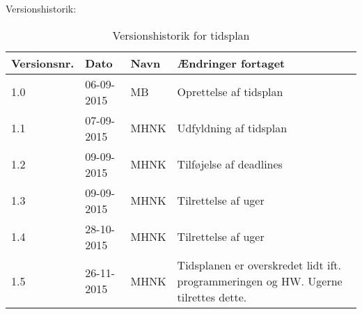 \documentclass[landscape, 12pt, letterpaper]{article}
\begin{document}
\begin{table}[]
Versionshistorik:
\centering
\caption{Versionshistorik for tidsplan}
\label{my-label}
\begin{tabular}{|l|l|l|l|}
\hline
Versionsnr. & Dato       & Navn & Ændringer fortaget     \\ \hline
1.0         & 06-09-2015 & MB   & Oprettelse af tidsplan \\ \hline
1.1         & 07-09-2015 & MHNK & Udfyldning af tidsplan \\ \hline
1.2         & 09-09-2015 & MHNK & Tilføjelse af deadlines\\ \hline
1.3         & 09-09-2015 & MHNK & Tilrettelse af uger    \\ \hline
1.4         & 28-10-2015 & MHNK & Tilrettelse af uger    \\ \hline
1.5         & 26-11-2015 & MHNK & Tidsplanen er overskredet lidt ift. programmeringen og HW. Ugerne tilrettes dette.     \\ \hline	
\end{tabular}
\end{table}
\end{document}
